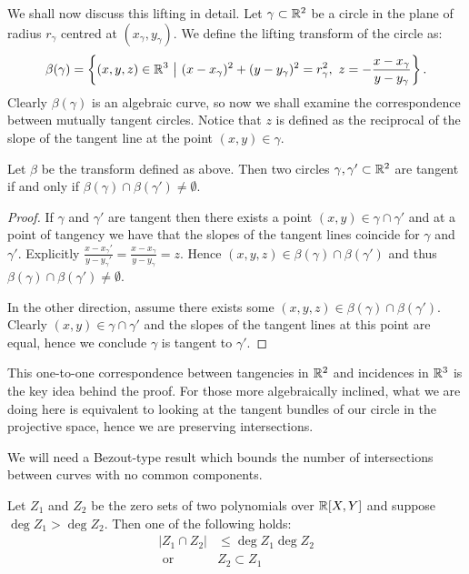 We shall now discuss this lifting in detail. Let $\gamma \subset \mathbb R^2$ be a circle in the plane of radius $r_{\gamma}$ centred at $(x_\gamma, y_\gamma)$. 
We define the lifting transform of the circle as: \[
    \beta(\gamma) = \left \{ (x,y,z) \in \mathbb R^3 \ \big | \ (x-x_\gamma)^2 + (y-y_\gamma)^2 = r_\gamma^2, \ z = - \frac{x-x_\gamma}{y-y_\gamma} \right \}.
\]  
Clearly $\beta(\gamma)$ is an algebraic curve, so now we shall examine the correspondence between mutually tangent circles. Notice that $z$ is defined as the reciprocal of the slope of the tangent line
at the point $(x,y) \in \gamma$.

\begin{lemma}
    Let $\beta$ be the transform defined as above. 
    Then two circles $\gamma, \gamma' \subset \mathbb R^2$ are tangent if and only if $\beta(\gamma) \cap \beta(\gamma') \neq \emptyset$.    \label{lem:beta-lift}
\end{lemma}
\begin{proof}
If $\gamma$ and $\gamma'$ are tangent then there exists a point $(x,y) \in \gamma \cap \gamma'$ and
at a point of tangency we have that the slopes of the tangent lines coincide for $\gamma$ and $\gamma'$. Explicitly $\frac{x-x_\gamma'}{y - y_\gamma'}= \frac{x-x_\gamma}{y - y_\gamma} = z$.
Hence $(x,y,z) \in \beta(\gamma) \cap \beta(\gamma')$ and thus $ \beta(\gamma) \cap \beta(\gamma') \neq \emptyset$.

In the other direction, assume there exists some $(x,y,z) \in \beta(\gamma) \cap \beta(\gamma')$. 
Clearly $(x,y) \in \gamma \cap \gamma'$ and the slopes of the tangent lines at this point are equal,
hence we conclude $\gamma$ is tangent to $\gamma'$.
\end{proof}
This one-to-one correspondence between tangencies in $\mathbb R^2$ and incidences in $\mathbb R^3$ is the key idea behind the proof. 
For those more algebraically inclined, what we are doing here is equivalent to looking at the tangent bundles of our circle in the projective space, hence we 
are preserving intersections.

We will need a Bezout-type result which bounds the number of intersections between curves with no common components.
\begin{lemma}     \label{lem:Bezout}
   Let $Z_1$ and $Z_2$ be the zero sets of two polynomials over $\mathbb R[X,Y]$ and suppose $\deg Z_1 > \deg Z_2$. Then one of the following holds:
   \begin{align*}
    |Z_1 \cap Z_2 | &\leq \deg Z_1 \deg Z_2 \\
    \text{ or } &Z_2 \subset Z_1
   \end{align*}
\end{lemma}



